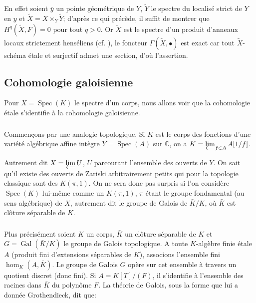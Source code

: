 \documentclass{article}
\DeclareMathOperator{\gal}{Gal}
\DeclareMathOperator{\spec}{Spec}
\newcommand{\dC}{\mathbb{C}}
\begin{document}
En effet soient $\bar y$ un pointe géométrique de $Y$, $\widetilde Y$ le 
spectre du localisé strict de $Y$ en $y$ et 
$\widetilde X=X\times_Y \widetilde Y$; d'après ce qui précède, il suffit de 
montrer que $H^q(\widetilde X,F) = 0$ pour tout $q>0$. Or $\widetilde X$ est le 
spectre d'un produit d'anneaux locaux strictement henséliens (cf. 
\cite[I]{11}), le foncteur $\Gamma(\widetilde X,\bullet)$ est exact car tout 
$\widetilde X$-schéma étale et surjectif admet une section, d'où l'assertion. 










\subsection{Cohomologie galoisienne}\label{2-4}

Pour $X=\spec(K)$ le spectre d'un corps, nous allons voir que la cohomologie 
étale s'identifie à la cohomologie galoisienne. 





\subsubsection{}\label{2-4-1}

Commençons par une analogie topologique. Si $K$ est le corps des fonctions 
d'une variété algébrique affine intègre $Y=\spec(A)$ sur $\dC$, on a 
$K=\varprojlim_{f\in A} A[1/f]$. 

Autrement dit $X=\varprojlim U$, $U$ parcourant l'ensemble des ouverts de $Y$. 
On sait qu'il existe des ouverts de Zariski arbitrairement petits qui pour la 
topologie classique sont des $K(\pi,1)$. On ne sera donc pas surpris si l'on 
considère $\spec(K)$ lui-même comme un $K(\pi,1)$, $\pi$ étant le groupe 
fondamental (au sens algébrique) de $X$, autrement dit le groupe de Galois de 
$\bar K/K$, où $\bar K$ est clôture séparable de $K$. 





\subsubsection{}\label{2-4-2}

Plus précisément soient $K$ un corps, $\bar K$ un clôture séparable de $K$ et 
$G = \gal(\bar K/K)$ le groupe de Galois topologique. A toute $K$-algèbre finie 
étale $A$ (produit fini d'extensions séparables de $K$), associons l'ensemble 
fini $\hom_K(A,\bar K)$. Le groupe de Galois $G$ opère sur cet ensemble à 
travers un quotient discret (donc fini). Si $A=K[T]/(F)$, il s'identifie à 
l'ensemble des racines dans $\bar K$ du polynôme $F$. La théorie de Galois, 
sous la forme que lui a donnée Grothendieck, dit que:
\end{document}
